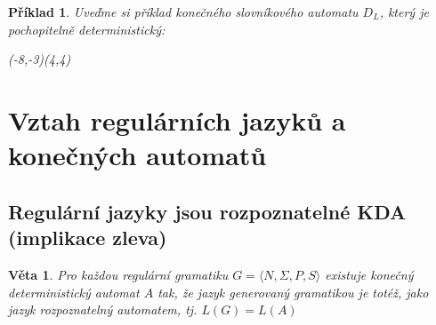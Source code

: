 \documentclass[10pt, a4paper, titlepage]{article}
\theoremstyle{note}
\newtheorem{veta}{\textbf{Věta}}
\newtheorem{priklad}{\textbf{Příklad}}
\begin{document}
\begin{priklad}
Uveďme si příklad konečného slovníkového automatu $D_{L}$, který je pochopitelně deterministický:



\begin{VCPicture}{(-8,-3)(4,4)}
\LargeState
{}



\end{VCPicture}

\end{priklad}


\section{Vztah regulárních jazyků a konečných automatů}

\subsection{Regulární jazyky jsou rozpoznatelné KDA (implikace zleva)}

\begin{veta}
Pro každou regulární gramatiku $G=\langle N,\Sigma,P,S \rangle$ existuje konečný deterministický automat $A$ tak, že jazyk generovaný gramatikou je totéž, jako jazyk rozpoznatelný automatem, tj. $L(G)=L(A)$
\end{veta} 
\end{document}
